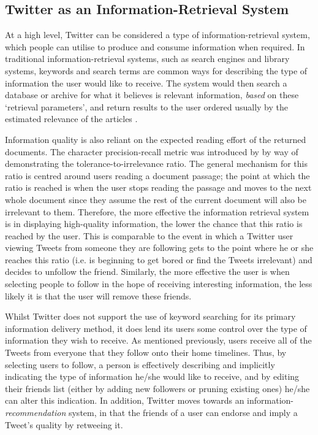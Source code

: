 \subsection{Twitter as an Information-Retrieval System}
At a high level, Twitter can be considered a type of information-retrieval system, which people can utilise to produce and consume information when required. In traditional information-retrieval systems, such as search engines and library systems, keywords and search terms are common ways for describing the type of information the user would like to receive. The system would then search a database or archive for what it believes is relevant information, \textit{based} on these `retrieval parameters', and return results to the user ordered usually by the estimated relevance of the articles \cite{arvola10}.

Information quality is also reliant on the expected reading effort of the returned documents. The character precision-recall metric was introduced by \citet{arvola10} by way of demonstrating the tolerance-to-irrelevance ratio. The general mechanism for this ratio is centred around users reading a document passage; the point at which the ratio is reached is when the user stops reading the passage and moves to the next whole document since they assume the rest of the current document will also be irrelevant to them. Therefore, the more effective the information retrieval system is in displaying high-quality information, the lower the chance that this ratio is reached by the user. This is comparable to the event in which a Twitter user viewing Tweets from someone they are following gets to the point where he or she reaches this ratio (i.e. is beginning to get bored or find the Tweets irrelevant) and decides to unfollow the friend. Similarly, the more effective the user is when selecting people to follow in the hope of receiving interesting information, the less likely it is that the user will remove these friends.

Whilst Twitter does not support the use of keyword searching for its primary information delivery method, it does lend its users some control over the type of information they wish to receive. As mentioned previously, users receive all of the Tweets from everyone that they follow onto their home timelines. Thus, by selecting users to follow, a person is effectively describing and implicitly indicating the type of information he/she would like to receive, and by editing their friends list (either by adding new followers or pruning existing ones) he/she can alter this indication. In addition, Twitter moves towards an information-\textit{recommendation} system, in that the friends of a user can endorse and imply a Tweet's quality by retweeing it.

